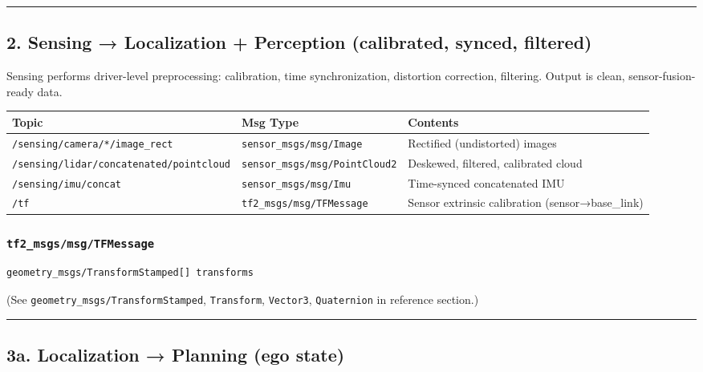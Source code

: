 \documentclass[
]{article}
\begin{document}
\begin{center}\rule{0.5\linewidth}{0.5pt}\end{center}

\subsection{2. Sensing → Localization + Perception (calibrated, synced,
filtered)}\label{2-sensing--localization--perception-calibrated-synced-filtered}

Sensing performs driver-level preprocessing: calibration, time
synchronization, distortion correction, filtering. Output is clean,
sensor-fusion-ready data.

\begin{longtable}[]{@{}lll@{}}
\toprule\noalign{}
Topic & Msg Type & Contents \\
\midrule\noalign{}
\endhead
\bottomrule\noalign{}
\endlastfoot
\texttt{/sensing/camera/*/image\_rect} & \texttt{sensor\_msgs/msg/Image}
& Rectified (undistorted) images \\
\texttt{/sensing/lidar/concatenated/pointcloud} &
\texttt{sensor\_msgs/msg/PointCloud2} & Deskewed, filtered, calibrated
cloud \\
\texttt{/sensing/imu/concat} & \texttt{sensor\_msgs/msg/Imu} &
Time-synced concatenated IMU \\
\texttt{/tf} & \texttt{tf2\_msgs/msg/TFMessage} & Sensor extrinsic
calibration (sensor→base\_link) \\
\end{longtable}

\subsubsection{\texorpdfstring{\texttt{tf2\_msgs/msg/TFMessage}}{tf2\_msgs/msg/TFMessage}}\label{tf2_msgsmsgtfmessage}

\begin{verbatim}
geometry_msgs/TransformStamped[] transforms
\end{verbatim}

(See \texttt{geometry\_msgs/TransformStamped}, \texttt{Transform},
\texttt{Vector3}, \texttt{Quaternion} in reference section.)

\begin{center}\rule{0.5\linewidth}{0.5pt}\end{center}

\subsection{3a. Localization → Planning (ego
state)}\label{3a-localization--planning-ego-state}
\end{document}
